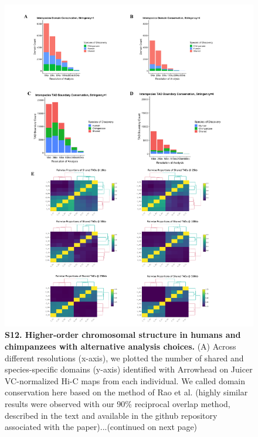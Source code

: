 \begin{figure}[!htb]
\centering
\includegraphics[width=4.5in]{img/figS12.1.pdf}
\caption[Higher-order chromosomal structure in humans and chimpanzees with alternative analysis choices.]{\textbf{S12. Higher-order chromosomal structure in humans and chimpanzees with alternative analysis choices.} (A) Across different resolutions (x-axis), we plotted the number of shared and species-specific domains (y-axis) identified with Arrowhead \cite{Durand.2016} on Juicer VC-normalized Hi-C maps from each individual. We called domain conservation here based on the method of Rao et al. \cite{Rao.2014} (highly similar results were observed with our 90\% reciprocal overlap method, described in the text and available in the github repository associated with the paper)...(continued on next page)}
\label{fig:figS12}
\end{figure}

